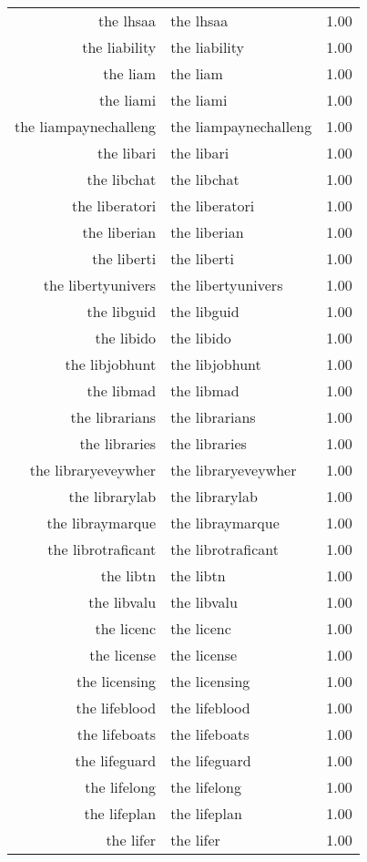 \begin{table}[ht]
\begin{tabular}{rlr}
  the lhsaa & the lhsaa & 1.00 \\ 
  the liability & the liability & 1.00 \\ 
  the liam & the liam & 1.00 \\ 
  the liami & the liami & 1.00 \\ 
  the liampaynechalleng & the liampaynechalleng & 1.00 \\ 
  the libari & the libari & 1.00 \\ 
  the libchat & the libchat & 1.00 \\ 
  the liberatori & the liberatori & 1.00 \\ 
  the liberian & the liberian & 1.00 \\ 
  the liberti & the liberti & 1.00 \\ 
  the libertyunivers & the libertyunivers & 1.00 \\ 
  the libguid & the libguid & 1.00 \\ 
  the libido & the libido & 1.00 \\ 
  the libjobhunt & the libjobhunt & 1.00 \\ 
  the libmad & the libmad & 1.00 \\ 
  the librarians & the librarians & 1.00 \\ 
  the libraries & the libraries & 1.00 \\ 
  the libraryeveywher & the libraryeveywher & 1.00 \\ 
  the librarylab & the librarylab & 1.00 \\ 
  the libraymarque & the libraymarque & 1.00 \\ 
  the librotraficant & the librotraficant & 1.00 \\ 
  the libtn & the libtn & 1.00 \\ 
  the libvalu & the libvalu & 1.00 \\ 
  the licenc & the licenc & 1.00 \\ 
  the license & the license & 1.00 \\ 
  the licensing & the licensing & 1.00 \\ 
  the lifeblood & the lifeblood & 1.00 \\ 
  the lifeboats & the lifeboats & 1.00 \\ 
  the lifeguard & the lifeguard & 1.00 \\ 
  the lifelong & the lifelong & 1.00 \\ 
  the lifeplan & the lifeplan & 1.00 \\ 
  the lifer & the lifer & 1.00 \\ 

\end{tabular}
\end{table}
